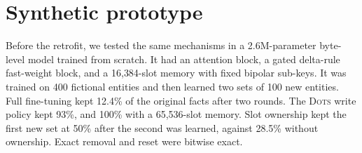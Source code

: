 \documentclass[11pt]{article}
\newcommand{\sys}{\textsc{Dots}}
\begin{document}
\section{Synthetic prototype}
\label{app:proto}
Before the retrofit, we tested the same mechanisms in a 2.6M-parameter byte-level model trained from scratch. It had an attention block, a gated delta-rule fast-weight block, and a 16{,}384-slot memory with fixed bipolar sub-keys. It was trained on 400 fictional entities and then learned two sets of 100 new entities. Full fine-tuning kept 12.4\% of the original facts after two rounds. The \sys{} write policy kept 93\%, and 100\% with a 65{,}536-slot memory. Slot ownership kept the first new set at 50\% after the second was learned, against 28.5\% without ownership. Exact removal and reset were bitwise exact.
\end{document}
